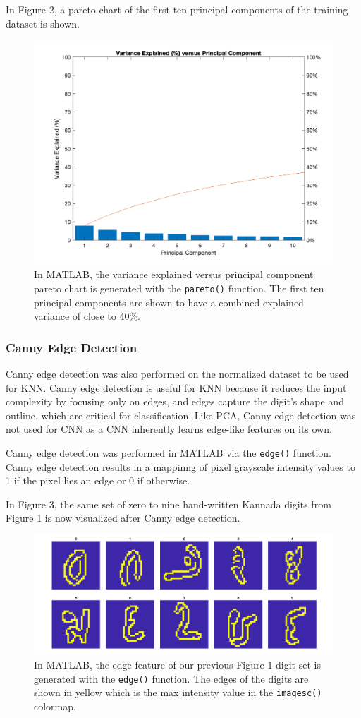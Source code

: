 \documentclass{article}
\begin{document}
In Figure 2, a pareto chart of the first ten principal components of the
training dataset is shown.

\begin{figure}
  \centering
  \includegraphics[width=0.65\linewidth]{pca.png}
  \caption{In MATLAB, the variance explained versus principal component pareto
    chart is generated with the \texttt{pareto()} function. The first ten
    principal components are shown to have a combined explained variance of
    close to 40\%.}
\end{figure}

\subsubsection{Canny Edge Detection}

Canny edge detection was also performed on the normalized dataset to be used for
KNN. Canny edge detection is useful for KNN because it reduces the input
complexity by focusing only on edges, and edges capture the digit’s shape and
outline, which are critical for classification. Like PCA, Canny edge detection
was not used for CNN as a CNN inherently learns edge-like features on its own.

Canny edge detection was performed in MATLAB via the \texttt{edge()}
function. Canny edge detection results in a mappinng of pixel grayscale
intensity values to 1 if the pixel lies an edge or 0 if otherwise.

In Figure 3, the same set of zero to nine hand-written Kannada digits from
Figure 1 is now visualized after Canny edge detection.

\begin{figure}
  \centering
  \includegraphics[width=0.65\linewidth]{edge.png}
  \caption{In MATLAB, the edge feature of our previous Figure 1 digit set is
    generated with the \texttt{edge()} function. The edges of the digits are
    shown in yellow which is the max intensity value in the \texttt{imagesc()}
    colormap.}
\end{figure}
\end{document}
